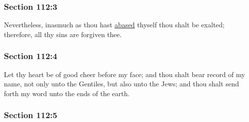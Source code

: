 
	\subsubsection{Section 112:3} %
		\label{DC112-3}

		Nevertheless, inasmuch as thou hast \hyperref[ABASE]{abased} thyself thou shalt be exalted; therefore, all thy sins are forgiven thee.


	\subsubsection{Section 112:4} %
		\label{DC112-4}

		Let thy heart be of good cheer before my face; and thou shalt bear record of my name, not only unto the Gentiles, but also unto the Jews; and thou shalt send forth my word unto the ends of the earth.


	\subsubsection{Section 112:5} %
		\label{DC112-5}

